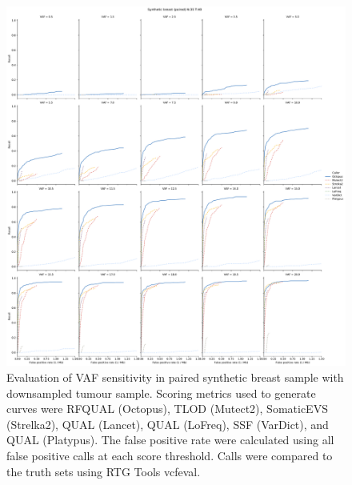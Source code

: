 \documentclass{article}
\begin{document}
\clearpage

\begin{figure}[ht!]
    \centering
    \includegraphics[width=\textwidth]{figures/paired_somatic_breast_n35_t40_vaf_recall.pdf}
    \caption{Evaluation of VAF sensitivity in paired synthetic breast sample with downsampled tumour sample. Scoring metrics used to generate curves were RFQUAL (Octopus), TLOD (Mutect2), SomaticEVS (Strelka2), QUAL (Lancet), QUAL (LoFreq), SSF (VarDict), and QUAL (Platypus). The false positive rate were calculated using all false positive calls at each score threshold. Calls were compared to the truth sets using RTG Tools vcfeval.}
    \label{supfig:paired-somatic-breast-n35-t40-vaf}
\end{figure}

\clearpage
\end{document}
